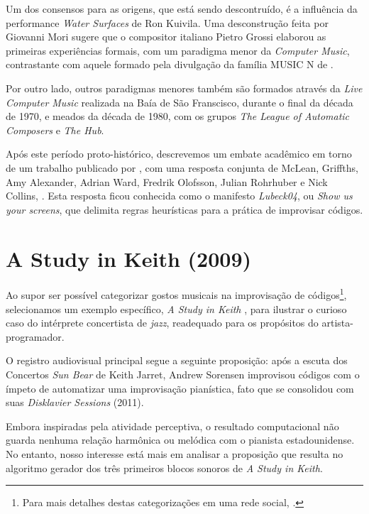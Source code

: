 Um dos consensos para as origens, que está sendo descontruído, é a influência da performance \emph{Water Surfaces} de Ron Kuivila. Uma desconstrução feita por Giovanni Mori sugere que o compositor italiano Pietro Grossi elaborou as primeiras experiências formais, com um paradigma menor da \emph{Computer Music}, contrastante com aquele formado pela divulgação da família MUSIC N de . 

Por outro lado, outros paradigmas menores também são formados através da \emph{Live Computer Music} realizada na Baía de São Franscisco, durante o final da década de 1970, e meados da década de 1980, com os grupos \emph{The League of Automatic Composers} e \emph{The Hub}.
 
Após este período proto-histórico, descrevemos um embate acadêmico em torno de um trabalho publicado por , com uma resposta conjunta de McLean, Griffths, Amy Alexander, Adrian Ward, Fredrik Olofsson, Julian Rohrhuber e Nick Collins, \cite{ward_live_2004}. Esta resposta ficou conhecida como o manifesto \emph{Lubeck04}, ou \emph{Show us your screens}, que delimita regras heurísticas para a prática de improvisar códigos.

\section*{A Study in Keith (2009)}

Ao supor ser possível categorizar gostos musicais na improvisação de códigos\footnote{Para mais detalhes destas categorizações em uma rede social, .}, selecionamos um exemplo específico, \emph{A Study in Keith} \cite{sorensen_keith_2009,sorensen_youtube_2014}, para ilustrar o curioso caso do intérprete concertista de \emph{jazz}, readequado para os propósitos do artista-programador.

O registro audiovisual principal segue a seguinte proposição: após a escuta dos Concertos \emph{Sun Bear} de Keith Jarret, Andrew Sorensen improvisou códigos com o ímpeto de automatizar uma improvisação pianística, fato que se consolidou com suas \emph{Disklavier Sessions} (2011).

Embora inspiradas pela atividade perceptiva, o resultado computacional não guarda nenhuma relação harmônica ou melódica com o pianista estadounidense. No entanto, nosso interesse está mais em analisar a proposição que resulta no algoritmo gerador dos três primeiros blocos sonoros de \emph{A Study in Keith}. 